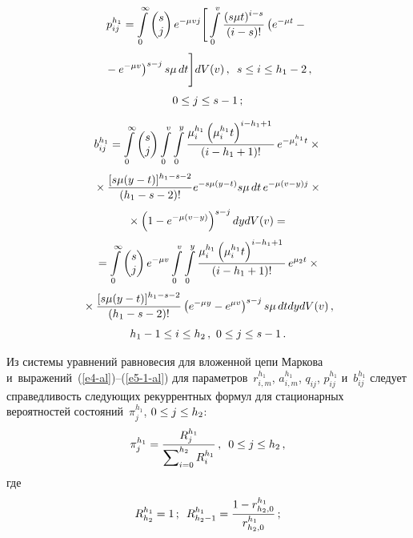 \begin{multicols}{2}
   
   \noindent
   \begin{multline}
   p_{ij}^{h_1} =\int\limits_0^\infty \begin{pmatrix}
   s\\ j\end{pmatrix} e^{-\mu v j} \Bigg[ \int\limits_0^v \displaystyle\frac{\displaystyle (s\mu t)^{i-s}\mathstrut}{\displaystyle (i-s)!\mathstrut}\left( e^{-\mu t}-{}\right.\\[3pt]
\left.   {}-e^{-\mu v}\right)^{s-j} s\mu\,dt\Bigg] dV(v)\,,\enskip 
   s\leq i\leq h_1-2\,,\\[3pt]
    0\leq j\leq s-1\,;
   \end{multline}
   
   \vspace*{-12pt}
   
   \noindent
   \begin{multline}
   b_{ij}^{h_1} =\int\limits_0^\infty \begin{pmatrix}
   s\\ j\end{pmatrix}
    \int\limits_0^v \int\limits_0^y \displaystyle\frac{\displaystyle \mu_i^{h_1}\left( \mu_i^{h_1}t\right)^{i-h_1+1}\mathstrut}{\displaystyle (i-h_1+1)!\mathstrut}\,e^{-\mu_i^{h_1} t}\times{}\\[3pt]
{}\times \displaystyle\frac{\displaystyle [s\mu(y-t)]^{h_1-s-2}\mathstrut}{\displaystyle (h_1-s-2)!\mathstrut} 
   e^{-s\mu(y-t)} s\mu\, dt \,e^{-\mu(v-y)j} \times{}\\[3pt]
   {}\times \left( 1-e^{-\mu(v-y)}\right)^{s-j} dydV(v)={}\\[3pt]
   {}=
   \int\limits_0^\infty \begin{pmatrix}
   s\\ j\end{pmatrix} 
   e^{-\mu v} \int\limits_0^v \int\limits_0^y \displaystyle\frac{\displaystyle \mu_i^{h_1}\left( \mu_i^{h_1} 
t\right)^{i-h_1+1}\mathstrut}{\displaystyle (i-h_1+1)!\mathstrut}\,e^{\mu_2 t}\times{}\\[3pt]
{}\times \displaystyle\frac{\displaystyle [s\mu(y-t)]^{h_1-s-2}\mathstrut}{\displaystyle (h_1-s-2)!\mathstrut}\left( e^{-\mu y} -e^{\mu v}\right)^{s-j} 
s\mu \,dt dy dV(v)\,,\\[3pt]
   h_1-1\leq i\leq h_2\,,\ 0\leq j\leq s-1\,.
   \label{e5-1-al}
   \end{multline}

  Из системы уравнений равновесия для вложенной цепи Маркова 
и~выражений~(\ref{e4-al})--(\ref{e5-1-al}) для па\-ра\-мет\-ров~$r_{i,m}^{h_1}$, $a_{i,m}^{h_1}$, 
$q_{ij}$, $p_{ij}^{h_1}$ и~$b_{ij}^{h_1}$ следует спра\-вед\-ли\-вость сле\-ду\-ющих 
рекуррентных формул для \mbox{стационарных} вероятностей 
со\-сто\-яний~$\pi_j^{h_1}$, $0\hm\leq j\hm\leq h_2$:
\begin{equation}
  \pi_j^{h_1}=\displaystyle\frac{\displaystyle R_j^{h_1}\mathstrut}{\displaystyle \sum\nolimits_{i=0}^{h_2} R_i^{h_1}\mathstrut}\,,\enskip 
0\leq j\leq h_2\,,
\label{e6-al}
  \end{equation}
  где
 \begin{equation*}
   R_{h_2}^{h_1} =1\,;\enskip R_{h_2-1}^{h_1}= \displaystyle\frac{\displaystyle 1-r^{h_1}_{h_2,0}\mathstrut}{\displaystyle r^{h_1}_{h_2,0}\mathstrut}\,;
  \end{equation*}
  

\end{multicols}
